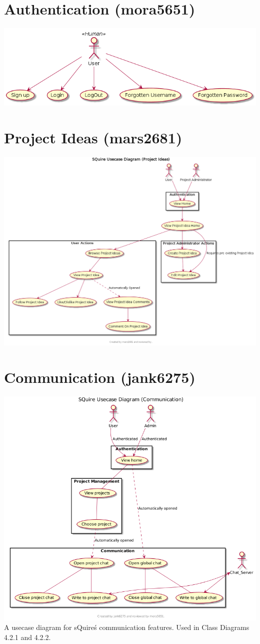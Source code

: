 \documentclass[11pt]{report}
\begin{document}
    \section{Authentication (mora5651)}
        \includegraphics[width=\textwidth]{diagrams/usecase-authentication}
    \section{Project Ideas (mars2681)}
        \includegraphics[width=\textwidth]{diagrams/usecase-projectideas}
    \section{Communication (jank6275)}
        \includegraphics[width=\textwidth]{diagrams/usecase-communication}
        A usecase diagram for sQuire\'s communication features. Used in Class Diagrams 4.2.1 and 4.2.2.
\end{document}
